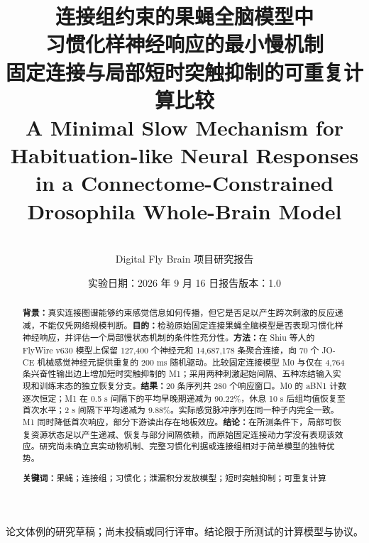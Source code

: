 \documentclass[UTF8,a4paper,zihao=-4,fontset=none]{ctexart}
\title{\vspace{-1.0em}\bfseries 连接组约束的果蝇全脑模型中\\习惯化样神经响应的最小慢机制\\[0.5em]
\large 固定连接与局部短时突触抑制的可重复计算比较\\[0.6em]
\normalsize\normalfont A Minimal Slow Mechanism for Habituation-like Neural Responses\\in a Connectome-Constrained Drosophila Whole-Brain Model}
\author{\ReportAuthor\\\small Digital Fly Brain 项目研究报告}
\date{\small 实验日期：2026 年 9 月 16 日\quad 报告版本：1.0}
\begin{document}
\maketitle
\thispagestyle{fancy}
\begin{center}\small\color{Gray}
论文体例的研究草稿；尚未投稿或同行评审。结论限于所测试的计算模型与协议。
\end{center}
\begin{abstract}
\noindent\textbf{背景：}真实连接图谱能够约束感觉信息如何传播，但它是否足以产生跨次刺激的反应递减，不能仅凭网络规模判断。\textbf{目的：}检验原始固定连接果蝇全脑模型是否表现习惯化样神经响应，并评估一个局部慢状态机制的条件性充分性。\textbf{方法：}在 Shiu 等人的 FlyWire v630 模型上保留 127,400 个神经元和 14,687,178 条聚合连接，向 70 个 JO-CE 机械感觉神经元提供重复的 200 ms 随机驱动。比较固定连接模型 M0 与仅在 4,764 条兴奋性输出边上增加短时突触抑制的 M1；采用两种刺激起始间隔、五种冻结输入实现和训练末态的独立恢复分支。\textbf{结果：}20 条序列共 280 个响应窗口。M0 的 aBN1 计数逐次恒定；M1 在 0.5 s 间隔下的平均早晚期递减为 90.22\%，休息 10 s 后组均值恢复至首次水平；2 s 间隔下平均递减为 9.88\%。实际感觉脉冲序列在同一种子内完全一致。M1 同时降低首次响应，部分下游读出存在地板效应。\textbf{结论：}在所测条件下，局部可恢复资源状态足以产生递减、恢复与部分间隔依赖，而原始固定连接动力学没有表现该效应。研究尚未确立真实动物机制、完整习惯化判据或连接组相对于简单模型的独特优势。

\medskip\noindent\textbf{关键词：}果蝇；连接组；习惯化；泄漏积分发放模型；短时突触抑制；可重复计算
\end{abstract}

\clearpage
\end{document}
